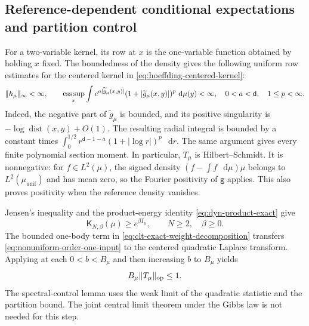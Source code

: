 \documentclass[11pt,reqno]{amsart}
\numberwithin{equation}{section}
\theoremstyle{plain}
\theoremstyle{definition}
\DeclarePairedDelimiter{\norm}{\lVert}{\rVert}
\renewcommand{\d}{\mathsf d}
\newcommand{\dd}{\mathop{}\!\mathrm d}
\newcommand{\op}{\mathrm{op}}
\newcommand{\be}{\beta}
\newcommand{\g}{\mathsf g}
\newcommand{\K}{\mathsf K}
\newcommand{\tl}{\widetilde}
\newcommand{\muunif}{\mu_{\mathrm{unif}}}
\begin{document}
\subsection{Reference-dependent conditional expectations and partition control}
\label{subsec:local-cutoffs}

For a two-variable kernel, its row at $x$ is the one-variable function obtained by holding $x$ fixed. The boundedness of the density gives the following uniform row estimates for the centered kernel in \eqref{eq:hoeffding-centered-kernel}:
\begin{equation}
 \norm{h_\mu}_\infty<\infty,\qquad
 \mathop{\operatorname{ess\,sup}}_x
 \int e^{a|\tl g_\mu(x,y)|}(1+|\tl g_\mu(x,y)|)^p\,\dd\mu(y)<\infty,
 \quad 0<a<\d,\quad 1\leq p<\infty.
 \label{eq:local-row-moments}
\end{equation}
Indeed, the negative part of $\tl g_\mu$ is bounded, and its positive singularity is $-\log\operatorname{dist}(x,y)+O(1)$. The resulting radial integral is bounded by a constant times $\int_0^{1/2}r^{\d-1-a}(1+|\log r|)^p\,\dd r$. The same argument gives every finite polynomial section moment. In particular, $T_\mu$ is Hilbert--Schmidt. It is nonnegative: for $f\in L^2(\mu)$, the signed density $(f-\int f\,\dd\mu)\mu$ belongs to $L^2(\muunif)$ and has mean zero, so the Fourier positivity of $\g$ applies. This also proves positivity when the reference density vanishes.

Jensen's inequality and the product-energy identity \eqref{eq:dyn-product-exact} give
\begin{equation}
 \K_{N,\be}(\mu)\geq e^{\be I_\mu},\qquad N\geq2,\quad \be\geq0.
 \label{eq:local-partition-lower}
\end{equation}
The bounded one-body term in \eqref{eq:clt-exact-weight-decomposition} transfers \eqref{eq:nonuniform-order-one-input} to the centered quadratic Laplace transform. Applying  at each $0<b<B_\mu$ and then increasing $b$ to $B_\mu$ yields
\begin{equation}
 B_\mu\norm{T_\mu}_{\op}\leq1.
 \label{eq:local-spectral-bound}
\end{equation}
The spectral-control lemma uses the weak limit of the quadratic statistic and the partition bound. The joint central limit theorem under the Gibbs law is not needed for this step.
\end{document}
